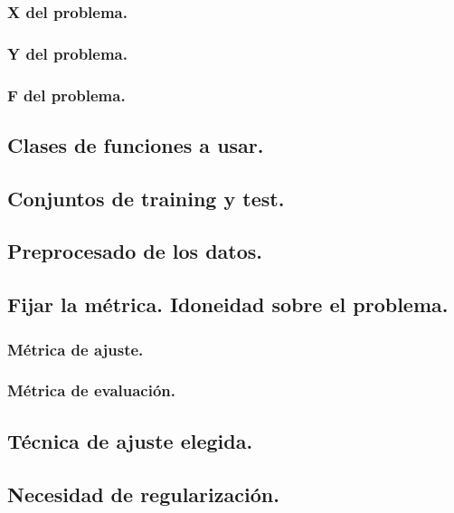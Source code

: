 \documentclass[12pt, spanish]{article}
\begin{document}
\subsubsection{X del problema.}


\subsubsection{Y del problema.}

\subsubsection{F del problema.}

\subsection{Clases de funciones a usar.}

\subsection{Conjuntos de training y test.}

\subsection{Preprocesado de los datos.}

\subsection{Fijar la métrica. Idoneidad sobre el problema.}

\subsubsection{Métrica de ajuste.}

\subsubsection{Métrica de evaluación.}

\subsection{Técnica de ajuste elegida.}

\subsection{Necesidad de regularización.}
\end{document}
